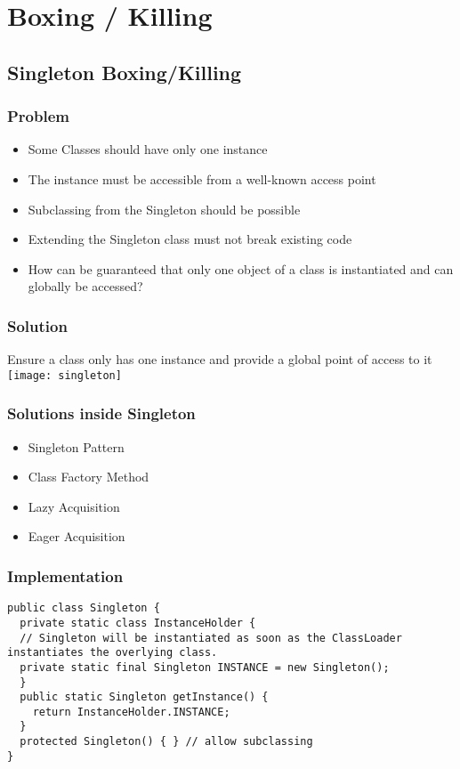 
\section{Boxing / Killing}
\subsection{Singleton Boxing/Killing}
\subsubsection{Problem}
\begin{itemize}[topsep=0pt]
    \itemsep -0.4em
    \item Some Classes should have only one instance
    \item The instance must be accessible from a well-known access point 
    \item Subclassing from the Singleton should be possible
    \item Extending the Singleton class must not break existing code
    \item How can be guaranteed that only one object of a class is instantiated and can globally be accessed?
\end{itemize}
\subsubsection{Solution}
Ensure a class only has one instance and provide a global point of access to it\\
\texttt{[image: singleton]}
\subsubsection{Solutions inside Singleton}
\begin{itemize}[topsep=0pt]
    \itemsep -0.4em
    \item Singleton Pattern
    \item Class Factory Method
    \item Lazy Acquisition
    \item Eager Acquisition
\end{itemize}
\subsubsection{Implementation}
\begin{lstlisting}[style=htmlcssjs]
public class Singleton {
  private static class InstanceHolder {
  // Singleton will be instantiated as soon as the ClassLoader instantiates the overlying class.
  private static final Singleton INSTANCE = new Singleton();
  }
  public static Singleton getInstance() {
    return InstanceHolder.INSTANCE;
  }
  protected Singleton() { } // allow subclassing
}
\end{lstlisting}
